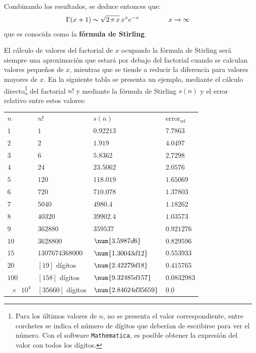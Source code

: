 \begin{ejemplo}
Combinando los resultados, se deduce entonces que:
\begin{align*}
\Gamma (x + 1) \thicksim \sqrt{2 \, \pi \, x} \, x^{x} e^{-x} \hspace{1.5cm} x \to \infty
\end{align*}
que es conocida como la \textbf{fórmula de Stirling}.
\par
El cálculo de valores del factorial de $x$ ocupando la fórmula de Stirling será siempre una aproximación que estará por debajo del factorial cuando se calculan valores pequeños de $x$, mientras que se tiende a reducir la diferencia para valores mayores de $x$. En la siguiente tabla se presenta un ejemplo, mediante el cálculo directo\footnote{Para los últimos valores de $n$, no se presenta el valor correspondiente, entre corchetes se indica el número de dígitos que deberían de escribirse para ver el número. Con el software \texttt{Mathematica}, es posible obtener la expresión del valor con todos los dígitos.} del factorial $n!$ y mediante la fórmula de Stirling $s(n)$ y el error relativo entre estos valores:

\begin{table}[H]
\centering
\begin{tabular}{l l l l}
$n$ & $n!$ & $s(n)$ & $\mbox{error}_{\mbox{rel}}$ \\
$1$ & $1$ & $0.92213$ & $7.7863$ \\ \hline
$2$ & $2$ & $1.919$ & $4.0497$ \\ \hline
$3$ & $6$ & $5.8362$ & $2.7298$ \\ \hline
$4$ & $24$ & $23.5062$ & $2.0576$ \\ \hline
$5$ & $120$ & $118.019$ & $1.65069$ \\ \hline
$6$ & $720$ & $710.078$ & $1.37803$ \\ \hline
$7$ & $5040$ & $4980.4$ & $1.18262$ \\ \hline
$8$ & $40320$ & $39902.4$ & $1.03573$ \\ \hline
$9$ & $362880$ & $359537$ & $0.921276$ \\ \hline
$10$ & $3628800$ & $\num{3.5987d6}$ & $0.829596$ \\ \hline
$15$ & $1307674368000$ & $\num{1.30043d12}$ & $0.553933$ \\ \hline
$20$ & $[19]$ dígitos & $\num{2.42279d18}$ & $0.415765$ \\ \hline
$100$ & $[158]$ dígitos & $\num{9.32485d157}$ & $0.0832983$ \\ \hline
$\num{e4}$ & $[35660]$ dígitos & $\num{2.84624d35659}$ & $0.0$ \\ \hline
\end{tabular}
\end{table}
\end{ejemplo}
